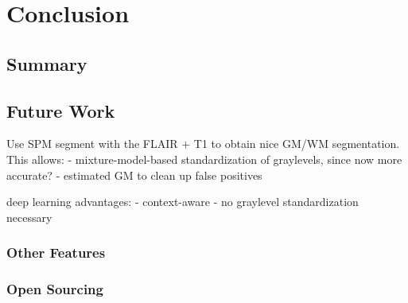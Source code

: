 \chapter{Conclusion}
\section{Summary}
\section{Future Work}
Use SPM segment with the FLAIR + T1 to obtain nice GM/WM segmentation. This allows:
- mixture-model-based standardization of graylevels, since now more accurate?
- estimated GM to clean up false positives

deep learning advantages:
- context-aware
- no graylevel standardization necessary
\subsection{Other Features}
\subsection{Open Sourcing}
